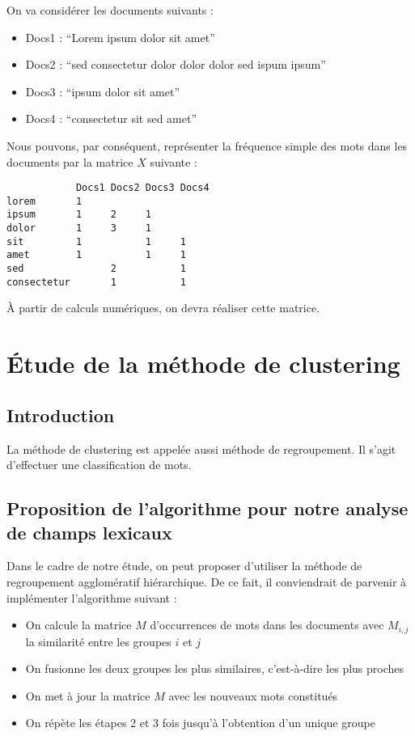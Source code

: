 \documentclass[a4paper,10pt]{article}
\begin{document}
On va considérer les documents suivants :

\begin{itemize}
\item Docs1 : ``Lorem ipsum dolor sit amet''
\item Docs2 : ``sed consectetur dolor dolor dolor sed ispum ipsum''
\item Docs3 : ``ipsum dolor sit amet''
\item Docs4 : ``consectetur sit sed amet''
\end{itemize}

Nous pouvons, par conséquent, représenter la fréquence simple
des mots dans les documents par la matrice $X$ suivante :

\begin{verbatim}
            Docs1 Docs2 Docs3 Docs4
lorem       1
ipsum       1     2     1
dolor       1     3     1
sit         1           1     1
amet        1           1     1
sed               2           1
consectetur       1           1
\end{verbatim}

\`A partir de calculs numériques,
on devra réaliser cette matrice.

\section{\'Etude de la méthode de clustering}
\subsection*{Introduction}

La méthode de clustering est appelée aussi
méthode de regroupement.
Il s’agit d’effectuer une classification de mots.

\subsection*{Proposition de l’algorithme pour notre
analyse de champs lexicaux}

Dans le cadre de notre étude, on peut proposer d’utiliser
la méthode de regroupement agglomératif hiérarchique.
De ce fait, il conviendrait de parvenir à implémenter
l’algorithme suivant :

\begin{itemize}
\item On calcule la matrice $M$ d’occurrences de mots
dans les documents avec $M_{i,j}$
la similarité entre les groupes $i$ et $j$
\item On fusionne les deux groupes les plus similaires,
c’est-à-dire les plus proches
\item On met à jour la matrice $M$ avec les nouveaux mots
constitués
\item On répète les étapes 2 et 3 fois jusqu’à l’obtention
d’un unique groupe
\end{itemize}
\end{document}
